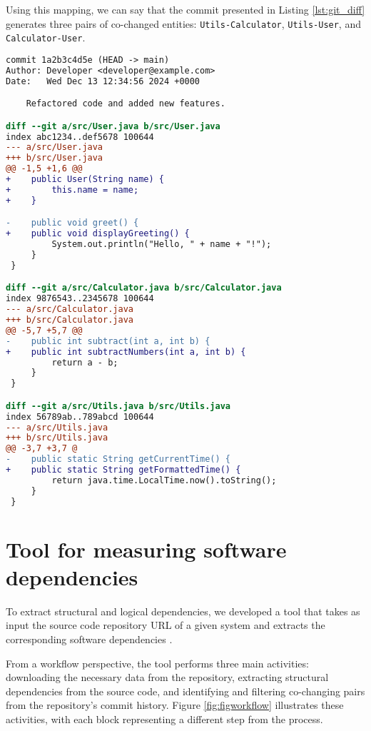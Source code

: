 Using this mapping, we can say that the commit presented in Listing \ref{lst:git_diff} generates three pairs of co-changed entities: \texttt{Utils-Calculator}, \texttt{Utils-User}, and \texttt{Calculator-User}.

\begin{lstlisting}[language=diff, caption={Example output of \texttt{git diff} between two commits.}, label={lst:git_diff}]
commit 1a2b3c4d5e (HEAD -> main)
Author: Developer <developer@example.com>
Date:   Wed Dec 13 12:34:56 2024 +0000

    Refactored code and added new features.

diff --git a/src/User.java b/src/User.java
index abc1234..def5678 100644
--- a/src/User.java
+++ b/src/User.java
@@ -1,5 +1,6 @@
+    public User(String name) {
+        this.name = name;
+    }

-    public void greet() {
+    public void displayGreeting() {
         System.out.println("Hello, " + name + "!");
     }
 }

diff --git a/src/Calculator.java b/src/Calculator.java
index 9876543..2345678 100644
--- a/src/Calculator.java
+++ b/src/Calculator.java
@@ -5,7 +5,7 @@ 
-    public int subtract(int a, int b) {
+    public int subtractNumbers(int a, int b) {
         return a - b;
     }
 }

diff --git a/src/Utils.java b/src/Utils.java
index 56789ab..789abcd 100644
--- a/src/Utils.java
+++ b/src/Utils.java
@@ -3,7 +3,7 @
-    public static String getCurrentTime() {
+    public static String getFormattedTime() {
         return java.time.LocalTime.now().toString();
     }
 }
\end{lstlisting}




\section{Tool for measuring software dependencies}
\label{subsec:tool_measuring_dependencies}

\hspace{4em}To extract structural and logical dependencies, we developed a tool that takes as input the source code repository URL of a given system and extracts the corresponding software dependencies \cite{DepSACI, enase19}. 

From a workflow perspective, the tool performs three main activities: downloading the necessary data from the repository, extracting structural dependencies from the source code, and identifying and filtering co-changing pairs from the repository's commit history. Figure \ref{fig:figworkflow} illustrates these activities, with each block representing a different step from the process.


